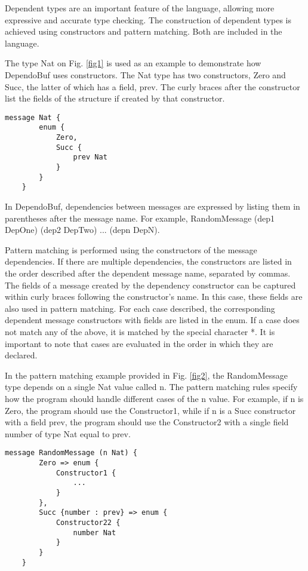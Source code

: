 \documentclass[conference]{IEEEtran}
\begin{document}
    Dependent types are an important feature of the language, allowing more expressive and accurate type checking. The construction of dependent types is achieved using constructors and pattern matching. Both are included in the language.

    The type Nat on Fig. \ref{fig1} is used as an example to demonstrate how DependoBuf uses constructors. The Nat type has two constructors, Zero and Succ, the latter of which has a field, prev. The curly braces after the constructor list the fields of the structure if created by that constructor.

    \begin{lstlisting}[caption={Type Nat in DependoBuf.},label={fig1}]
    message Nat {
        enum {
            Zero,
            Succ {
                prev Nat    
            }
        }
    }
    \end{lstlisting}

    
    In DependoBuf, dependencies between messages are expressed by listing them in parentheses after the message name. For example, RandomMessage (dep1 DepOne) (dep2 DepTwo) ... (depn DepN).


    Pattern matching is performed using the constructors of the message dependencies. If there are multiple dependencies, the constructors are listed in the order described after the dependent message name, separated by commas. The fields of a message created by the dependency constructor can be captured within curly braces following the constructor's name. In this case, these fields are also used in pattern matching. For each case described, the corresponding dependent message constructors with fields are listed in the enum. If a case does not match any of the above, it is matched by the special character *. It is important to note that cases are evaluated in the order in which they are declared.

    In the pattern matching example provided in Fig. \ref{fig2}, the RandomMessage type depends on a single Nat value called n. The pattern matching rules specify how the program should handle different cases of the n value. For example, if n is Zero, the program should use the Constructor1, while if n is a Succ constructor with a field prev, the program should use the Constructor2 with a single field number of type Nat equal to prev.

    \begin{lstlisting}[caption={RandomMessage depend on Nat message, pattern-matching example.},label={fig2}]
    message RandomMessage (n Nat) {
        Zero => enum {
            Constructor1 {
                ...    
            }
        },
        Succ {number : prev} => enum {
            Constructor22 {
                number Nat
            }
        }
    }
    \end{lstlisting}
\end{document}
